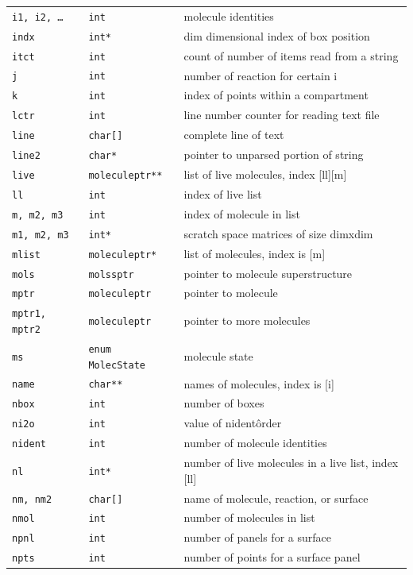 \documentclass {scrbook}
\newcommand {\ttt} {\texttt}
\begin{document}
\begin{longtable}[c]{lll}
\ttt{i1, i2, \ldots} & \ttt{int} & molecule identities\\
\ttt{indx} & \ttt{int*} & dim dimensional index of box position\\
\ttt{itct} & \ttt{int} & count of number of items read from a string\\
\ttt{j} & \ttt{int} & number of reaction for certain i\\
\ttt{k} & \ttt{int} & index of points within a compartment\\
\ttt{lctr} & \ttt{int} & line number counter for reading text file\\
\ttt{line} & \ttt{char[]} & complete line of text\\
\ttt{line2} & \ttt{char*} & pointer to unparsed portion of string\\
\ttt{live} & \ttt{moleculeptr**} & list of live molecules, index [ll][m]\\
\ttt{ll} & \ttt{int} & index of live list\\
\ttt{m, m2, m3} & \ttt{int} & index of molecule in list\\
\ttt{m1, m2, m3} & \ttt{int*} & scratch space matrices of size dimxdim\\
\ttt{mlist} & \ttt{moleculeptr*} & list of molecules, index is [m]\\
\ttt{mols} & \ttt{molssptr} & pointer to molecule superstructure\\
\ttt{mptr} & \ttt{moleculeptr} & pointer to molecule\\
\ttt{mptr1, mptr2} & \ttt{moleculeptr} & pointer to more molecules\\
\ttt{ms} & \ttt{enum MolecState} & molecule state\\
\ttt{name} & \ttt{char**} & names of molecules, index is [i]\\
\ttt{nbox} & \ttt{int} & number of boxes\\
\ttt{ni2o} & \ttt{int} & value of nident\^order\\
\ttt{nident} & \ttt{int} & number of molecule identities\\
\ttt{nl} & \ttt{int*} & number of live molecules in a live list, index [ll]\\
\ttt{nm, nm2} & \ttt{char[]} & name of molecule, reaction, or surface\\
\ttt{nmol} & \ttt{int} & number of molecules in list\\
\ttt{npnl} & \ttt{int} & number of panels for a surface\\
\ttt{npts} & \ttt{int} & number of points for a surface panel\\

\end{longtable}
\end{document}
